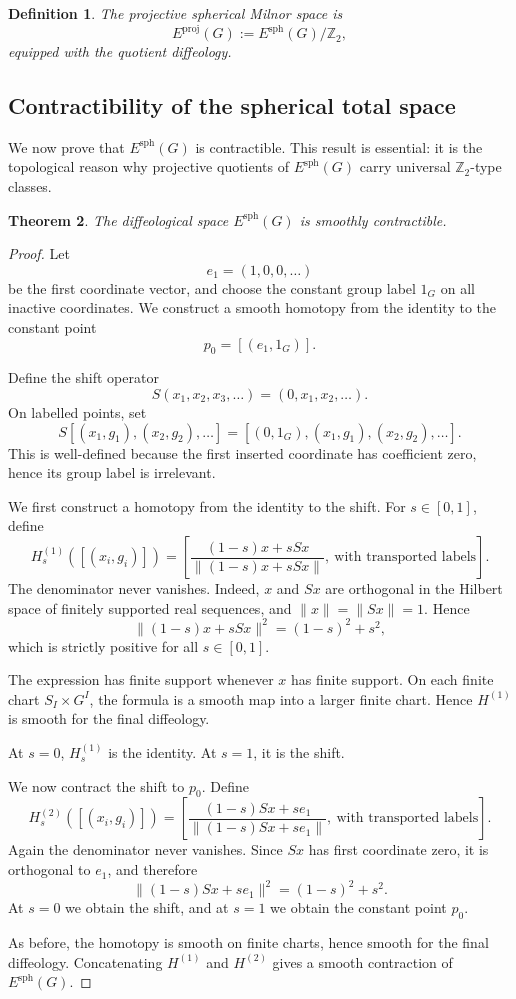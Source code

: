 \documentclass[11pt]{amsart}
\newtheorem{definition}{Definition}[section]
\newtheorem{theorem}[definition]{Theorem}
\begin{document}
\begin{definition}
The projective spherical Milnor space is
\[
E^{\mathrm{proj}}(G)
:=
E^{\mathrm{sph}}(G)/\mathbb Z_2,
\]
equipped with the quotient diffeology.
\end{definition}

\subsection{Contractibility of the spherical total space}

We now prove that \(E^{\mathrm{sph}}(G)\) is contractible. This result is essential: it is the topological reason why projective quotients of \(E^{\mathrm{sph}}(G)\) carry universal \(\mathbb Z_2\)-type classes.

\begin{theorem}
The diffeological space \(E^{\mathrm{sph}}(G)\) is smoothly contractible.
\end{theorem}

\begin{proof}
Let
\[
e_1=(1,0,0,\ldots)
\]
be the first coordinate vector, and choose the constant group label \(1_G\) on all inactive coordinates. We construct a smooth homotopy from the identity to the constant point
\[
p_0=[(e_1,1_G)].
\]

Define the shift operator
\[
S(x_1,x_2,x_3,\ldots)=(0,x_1,x_2,\ldots).
\]
On labelled points, set
\[
S[(x_1,g_1),(x_2,g_2),\ldots]
=
[(0,1_G),(x_1,g_1),(x_2,g_2),\ldots].
\]
This is well-defined because the first inserted coordinate has coefficient zero, hence its group label is irrelevant.

We first construct a homotopy from the identity to the shift. For \(s\in[0,1]\), define
\[
H_s^{(1)}([(x_i,g_i)])
=
\left[
\frac{(1-s)x+sSx}{\|(1-s)x+sSx\|},
\ \text{with transported labels}
\right].
\]
The denominator never vanishes. Indeed, \(x\) and \(Sx\) are orthogonal in the Hilbert space of finitely supported real sequences, and \(\|x\|=\|Sx\|=1\). Hence
\[
\|(1-s)x+sSx\|^2
=
(1-s)^2+s^2,
\]
which is strictly positive for all \(s\in[0,1]\).

The expression has finite support whenever \(x\) has finite support. On each finite chart \(S_I\times G^I\), the formula is a smooth map into a larger finite chart. Hence \(H^{(1)}\) is smooth for the final diffeology.

At \(s=0\), \(H_s^{(1)}\) is the identity. At \(s=1\), it is the shift.

We now contract the shift to \(p_0\). Define
\[
H_s^{(2)}([(x_i,g_i)])
=
\left[
\frac{(1-s)Sx+s e_1}{\|(1-s)Sx+s e_1\|},
\ \text{with transported labels}
\right].
\]
Again the denominator never vanishes. Since \(Sx\) has first coordinate zero, it is orthogonal to \(e_1\), and therefore
\[
\|(1-s)Sx+s e_1\|^2
=
(1-s)^2+s^2.
\]
At \(s=0\) we obtain the shift, and at \(s=1\) we obtain the constant point \(p_0\).

As before, the homotopy is smooth on finite charts, hence smooth for the final diffeology. Concatenating \(H^{(1)}\) and \(H^{(2)}\) gives a smooth contraction of \(E^{\mathrm{sph}}(G)\).
\end{proof}
\end{document}
